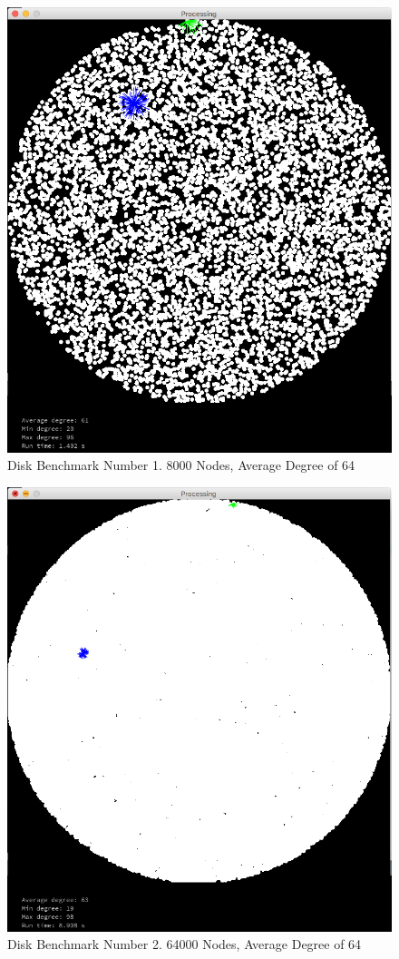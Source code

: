 \documentclass{article}
\begin{document}
\begin{figure}
    \centering
    \includegraphics[scale=0.45]{./images/disk_0.png}
    \caption{Disk Benchmark Number 1. 8000 Nodes, Average Degree of 64}
    \label{disk0}
\end{figure}

\begin{figure}
    \centering
    \includegraphics[scale=0.45]{./images/disk_1.png}
    \caption{Disk Benchmark Number 2. 64000 Nodes, Average Degree of 64}
    \label{disk1}
\end{figure}
\end{document}
